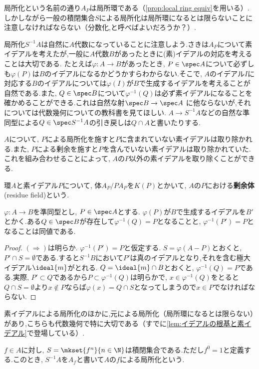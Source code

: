 局所化という名前の通り$A_P$は局所環である（\ref{prop:local ring equiv}を用いる）.しかしながら一般の積閉集合$S$による局所化は局所環になるとは限らないことに注意しなければならない（分数化,と呼べばよいだろうか？）.

局所化$S^{-1}A$は自然に$A$代数になっていることに注意しよう.さきは$A_P$について素イデアルを考えたが,一般に$A$代数$B$があったときに(素)イデアルの対応を考えることは大切である. たとえば$\varphi:A\to B$があったとき, $P\in\spec A$について必ずしも$\varphi(P)$は$B$のイデアルになるかどうかすらわからない.そこで, $A$のイデアル$I$に対応する$B$のイデアルについては$\varphi(I)$が$B$で生成するイデアルを考えることが自然である.また, $Q\in\spec B$について$\varphi^{-1}(Q)$は必ず素イデアルになることを確かめることができる.これは自然な射$\spec B\to\spec A$
に他ならないが,それについては代数幾何についての教科書を見てほしい. $A\to S^{-1}A$などの自然な準同型による$Q\in\spec S^{-1}A$の引き戻しは$Q\cap A$と書いたりする.

$A$について, $P$による局所化を施すと$P$に含まれていない素イデアルは取り除かれる.また, $P$による剰余を施すと$P$を含んでいない素イデアルは取り除かれていた.これを組み合わせることによって, $A$の$P$以外の素イデアルを取り除くことができる.
\begin{defi}[剰余体]\label{defi:剰余体}
	環$A$と素イデアル$P$について, 体$A_P/PA_P$を$K(P)$とかいて, $A$の$P$における\textbf{剰余体}(residue field)という.
\end{defi}


\begin{prop}\label{prop:上にイデアルがあることの同値条件}
	$\varphi:A\to B$を準同型とし, $P\in\spec A$とする. $\varphi(P)$が$B$で生成するイデアルを$B'$とかく.ある$Q\in\spec B$が存在して$\varphi^{-1}(Q)=P$となることと, $\varphi^{-1}(P')=P$となることは同値である.
\end{prop}

\begin{proof}
	$(\Longrightarrow)$は明らか. $\varphi^{-1}(P')=P$と仮定する. $S=\varphi(A-P)$とおくと, $P'\cap S=\emptyset$である.すると$S^{-1}B$において$P'$は真のイデアルとなり,それを含む極大イデアル$\ideal{m}$がとれる. $Q=\ideal{m}\cap B$とおくと, $\varphi^{-1}(Q)=P$である.実際, $P'\subset Q$であるから$P\subset\varphi^{-1}(Q)$は明らかで, $x\in\varphi^{-1}(Q)$をとると$Q\cap S=\emptyset$より$x\not\in P$ならば$\varphi(x)=Q\cap S$となってしまうので$x\in P$でなければならない.
\end{proof}

素イデアルによる局所化のほかに,元による局所化（局所環になるとは限らない）があり,こちらも代数幾何で特に大切である（すでに\ref{lem:イデアルの根基と素イデアル}で登場している）.
\begin{defi}
	$f\in A$に対し, $S=\mkset{f^n}{n\in\N}$は積閉集合である.ただし$f^0=1$と定義する.このとき, $S^{-1}A$を$A_f$と書いて$A$の$f$による局所化という.	
\end{defi}

